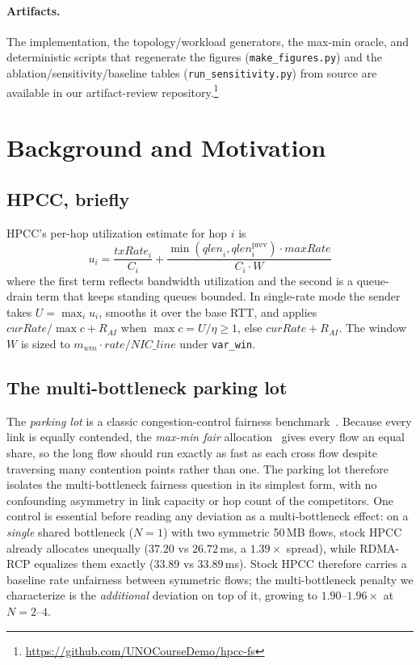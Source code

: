 \documentclass[sigconf, nonacm]{acmart}
\newcommand{\hpccfs}{\textsc{RDMA-RCP}\xspace}
\begin{document}
\paragraph{Artifacts.} The implementation, the topology/workload generators, the max-min oracle,
and deterministic scripts that regenerate the figures (\texttt{make\_figures.py}) and the
ablation/sensitivity/baseline tables (\texttt{run\_sensitivity.py}) from source are available in our
artifact-review repository.\footnote{\url{https://github.com/UNOCourseDemo/hpcc-fs}}

\section{Background and Motivation}
\label{sec:bg}

\subsection{HPCC, briefly}

HPCC's per-hop utilization estimate for hop $i$ is
\begin{equation}
u_i = \frac{\mathit{txRate}_i}{C_i} + \frac{\min(\mathit{qlen}_i, \mathit{qlen}_i^{\mathrm{prev}}) \cdot \mathit{maxRate}}{C_i \cdot W}
\end{equation}
where the first term reflects bandwidth utilization and the second is a queue-drain term that
keeps standing queues bounded. In single-rate mode the sender takes $U = \max_i u_i$, smooths
it over the base RTT, and applies $\mathit{curRate}/\max c + R_{AI}$ when
$\max c = U/\eta \ge 1$, else $\mathit{curRate} + R_{AI}$. The window $W$ is sized to
$m_{win} \cdot \mathit{rate} / \mathit{NIC\_line}$ under \texttt{var\_win}.

\subsection{The multi-bottleneck parking lot}

The \emph{parking lot} is a classic congestion-control fairness
benchmark~\cite{bertsekas1992data, katabi2002xcp}. Because every link is equally contended, the
\emph{max-min fair} allocation~\cite{bertsekas1992data} gives every flow an equal share, so the
long flow should run exactly as fast as each cross flow despite traversing many contention points
rather than one. The parking lot therefore isolates the multi-bottleneck fairness question in its
simplest form, with no confounding asymmetry in link capacity or hop count of the competitors.
One control is essential before reading any deviation as a multi-bottleneck effect: on a
\emph{single} shared bottleneck ($N{=}1$) with two symmetric 50\,MB flows, stock HPCC already
allocates unequally ($37.20$ vs $26.72$\,ms, a $1.39\times$ spread), while \hpccfs equalizes
them exactly ($33.89$ vs $33.89$\,ms). Stock HPCC therefore carries a baseline rate unfairness
between symmetric flows; the multi-bottleneck penalty we characterize is the \emph{additional}
deviation on top of it, growing to $1.90$--$1.96\times$ at $N = 2$--$4$.
\end{document}
